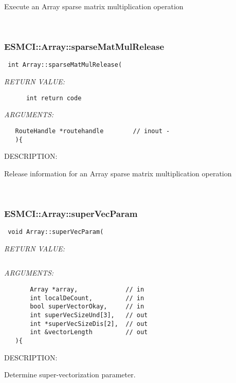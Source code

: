       Execute an Array sparse matrix multiplication operation
   
 
\mbox{}\hrulefill\
 
\subsubsection [ESMCI::Array::sparseMatMulRelease] {ESMCI::Array::sparseMatMulRelease}


  
\begin{verbatim} int Array::sparseMatMulRelease(\end{verbatim}{\em RETURN VALUE:}
\begin{verbatim}      int return code\end{verbatim}{\em ARGUMENTS:}
\begin{verbatim}   RouteHandle *routehandle        // inout -
   ){\end{verbatim}
{\sf DESCRIPTION:\\ }


      Release information for an Array sparse matrix multiplication operation
   
 
\mbox{}\hrulefill\
 
\subsubsection [ESMCI::Array::superVecParam] {ESMCI::Array::superVecParam}


  
\begin{verbatim} void Array::superVecParam(\end{verbatim}{\em RETURN VALUE:}
\begin{verbatim} \end{verbatim}{\em ARGUMENTS:}
\begin{verbatim}       Array *array,             // in
       int localDeCount,         // in
       bool superVectorOkay,     // in
       int superVecSizeUnd[3],   // out
       int *superVecSizeDis[2],  // out
       int &vectorLength         // out
   ){\end{verbatim}
{\sf DESCRIPTION:\\ }


      Determine super-vectorization parameter.
   
